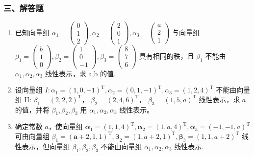 \documentclass[12pt, a4paper]{ctexart}
\begin{document}
\subsubsection*{三、解答题}

\begin{enumerate}[start=10]
    \item 已知向量组 $ \alpha_{1}=\begin{pmatrix}0\\ 1\\ 2\end{pmatrix},\alpha_{2}=\begin{pmatrix}2\\ 0\\ 1\end{pmatrix},\alpha_{3}=\begin{pmatrix}a\\ 2\\ 1\end{pmatrix} $ 与向量组 $ \beta_{1}=\begin{pmatrix}b\\ 1\\ 0\end{pmatrix},\beta_{2}=\begin{pmatrix}1\\ 0\\ -1\end{pmatrix},\beta_{3}=\begin{pmatrix}8\\ 7\\ 6\end{pmatrix} $ 具有相同的秩，且 $ \beta_{1} $ 不能由 $ \alpha_{1},\alpha_{2},\alpha_{3} $ 线性表示，求 a,b 的值.

    \item 设向量组 $ I: \alpha_1 = (1, 0, -1)^\mathrm{T}, \alpha_2 = (0, 1, -1)^\mathrm{T}, \alpha_3 = (1, 2, 4)^\mathrm{T} $ 不能由向量组 II: $ \beta_1 = (2, 2, 2)^\mathrm{T} $， $ \beta_2 = (2, 4, 6)^\mathrm{T} $， $ \beta_3 = (1, 5, a)^\mathrm{T} $ 线性表示，求 $ a $ 的值，并将 $ \beta_1, \beta_2, \beta_3 $ 用 $ \alpha_1, \alpha_2, \alpha_3 $ 线性表示。

    \item 确定常数 $ a $，使向量组 $ \boldsymbol{\alpha}_{1}=(1,1,4)^{\mathrm{T}},\boldsymbol{\alpha}_{2}=(1,a,4)^{\mathrm{T}},\boldsymbol{\alpha}_{3}=(-1,-1,a)^{\mathrm{T}} $ 可由向量组 $ \beta_{1}=(\boldsymbol{a}+2,1,1)^{\mathrm{T}},\boldsymbol{\beta}_{2}=(1,a+2,1)^{\mathrm{T}},\boldsymbol{\beta}_{3}=(1,1,a+2)^{\mathrm{T}} $ 线性表示，但向量组 $ \beta_{1},\beta_{2},\beta_{3} $ 不能由向量组 $ \alpha_{1},\alpha_{2},\alpha_{3} $ 线性表示.


\end{enumerate}
\end{document}

